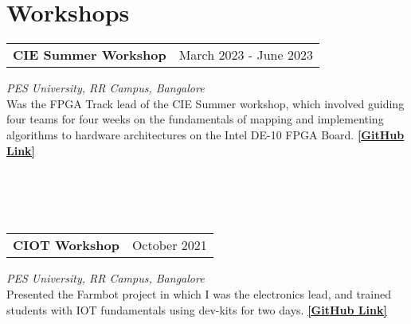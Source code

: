 \section{\sc Workshops}

\begin{tabular}{@{}p{4in}p{2in}}
  {\bf{CIE Summer Workshop}}  & March 2023 - June 2023   \\                  
\end{tabular}                                                                                                                                    
\textit{PES University, RR Campus, Bangalore} \\
Was the FPGA Track lead of the CIE Summer workshop, which involved guiding four teams for four weeks on the fundamentals of mapping and implementing algorithms to hardware architectures on the Intel DE-10 FPGA Board. \href{https://github.com/CIE-PESU/DE10_FPGA}{{\bf{[GitHub Link]}}}
\\
\\
\\ %
\\
\\
\begin{tabular}{@{}p{4in}p{2in}}
  {\bf{CIOT Workshop}}  & October 2021                           
\end{tabular}                 
\textit{PES University, RR Campus, Bangalore} \\
Presented the Farmbot project in which I was the electronics lead, and trained students with IOT fundamentals using dev-kits for two days. \href{https://github.com/govardhnn/farmbot-pesu}{{\bf{[GitHub Link]}}}    
\endinput

